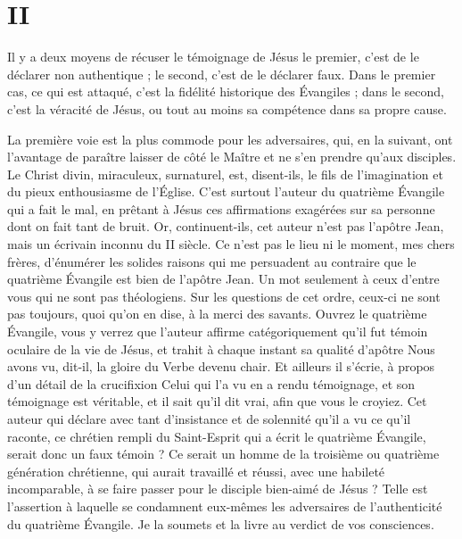 \section{II}

Il y a deux moyens de récuser le témoignage de Jésus\frcolon{} le premier, c’est de le déclarer non authentique ; le second, c’est de le déclarer faux. Dans le premier cas, ce qui est attaqué, c’est la fidélité historique des Évangiles ; dans le second, c’est la véracité de Jésus, ou tout au moins sa compétence dans sa propre cause.

La première voie est la plus commode pour les adversaires, qui, en la suivant, ont l’avantage de paraître laisser de côté le Maître et ne s’en prendre qu’aux disciples. Le Christ divin, miraculeux, surnaturel, est, disent-ils, le fils de l’imagination et du pieux enthousiasme de l’Église. C’est surtout l’auteur du quatrième Évangile qui a fait le mal, en prêtant à Jésus ces affirmations exagérées sur sa personne dont on fait tant de bruit. Or, continuent-ils, cet auteur n’est pas l’apôtre Jean, mais un écrivain inconnu du II siècle. \ocadr{} Ce n’est pas le lieu ni le moment, mes chers frères, d’énumérer les solides raisons qui me persuadent au contraire que le quatrième Évangile est bien de l’apôtre Jean. Un mot seulement à ceux d’entre vous qui ne sont pas théologiens. Sur les questions de cet ordre, ceux-ci ne sont pas toujours, quoi qu’on en dise, à la merci des savants. Ouvrez le quatrième Évangile, vous y verrez que l’auteur affirme catégoriquement qu’il fut témoin oculaire de la vie de Jésus, et trahit à chaque instant sa qualité d’apôtre\frcolon{} \Og{} Nous avons vu, dit-il, la gloire du Verbe devenu chair.\Fg{} Et ailleurs il s’écrie, à propos d’un détail de la crucifixion\frcolon{} \Og{} Celui qui l’a vu en a rendu témoignage, et son témoignage est véritable, et il sait qu’il dit vrai, afin que vous le croyiez.\Fg{} Cet auteur qui déclare avec tant d’insistance et de solennité qu’il a vu ce qu’il raconte, ce chrétien rempli du Saint-Esprit qui a écrit le quatrième Évangile, serait donc un faux témoin ? Ce serait un homme de la troisième ou quatrième génération chrétienne, qui aurait travaillé et réussi, avec une habileté incomparable, à se faire passer pour le disciple bien-aimé de Jésus ? \ocadr{} Telle est l’assertion à laquelle se condamnent eux-mêmes les adversaires de l’authenticité du quatrième Évangile. Je la soumets et la livre au verdict de vos consciences.

